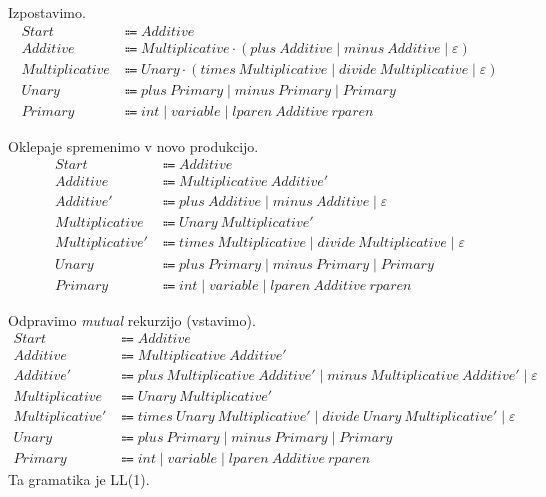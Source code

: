 \documentclass{report}
\newcommand{\Null}{\varepsilon}
\newcommand{\Seq}{\cdot}
\newcommand{\Spc}{\ }
\newcommand{\Union}{\mathrel{|}}
\newcommand{\Arrow}{\Coloneq}
\newcommand{\NT}[1]{{#1}}
\newcommand{\T}[1]{{#1}}
\begin{document}
Izpostavimo.
\begin{align*}
  \NT{Start} &\Arrow \NT{Additive}\\
  \NT{Additive} &\Arrow \NT{Multiplicative} \Seq (\T{plus} \Spc \NT{Additive} \Union \T{minus} \Spc \NT{Additive} \Union \Null)\\
  \NT{Multiplicative} &\Arrow \NT{Unary} \Seq (\T{times} \Spc \NT{Multiplicative} \Union \T{divide} \Spc \NT{Multiplicative} \Union \Null)\\
  \NT{Unary} &\Arrow \T{plus} \Spc \NT{Primary} \Union \T{minus} \Spc \NT{Primary} \Union \NT{Primary}\\ 
  \NT{Primary} &\Arrow \T{int} \Union \T{variable} \Union \T{lparen} \Spc \NT{Additive} \Spc \T{rparen}
\end{align*}

Oklepaje spremenimo v novo produkcijo.
\begin{align*}
  \NT{Start} &\Arrow \NT{Additive}\\
  \NT{Additive} &\Arrow \NT{Multiplicative} \Spc \NT{Additive'}\\
  \NT{Additive'} &\Arrow \T{plus} \Spc \NT{Additive} \Union \T{minus} \Spc \NT{Additive} \Union \Null\\
  \NT{Multiplicative} &\Arrow \NT{Unary} \Spc \NT{Multiplicative'}\\
  \NT{Multiplicative'} &\Arrow \T{times} \Spc \NT{Multiplicative} \Union \T{divide} \Spc \NT{Multiplicative} \Union \Null\\
  \NT{Unary} &\Arrow \T{plus} \Spc \NT{Primary} \Union \T{minus} \Spc \NT{Primary} \Union \NT{Primary}\\ 
  \NT{Primary} &\Arrow \T{int} \Union \T{variable} \Union \T{lparen} \Spc \NT{Additive} \Spc \T{rparen}
\end{align*}

Odpravimo \emph{mutual} rekurzijo (vstavimo).
\begin{align*}
  \NT{Start} &\Arrow \NT{Additive}\\[1em]
  \NT{Additive} &\Arrow \NT{Multiplicative} \Spc \NT{Additive'}\\
  \NT{Additive'} &\Arrow \T{plus} \Spc \NT{Multiplicative} \Spc \NT{Additive'} \Union \T{minus} \Spc \NT{Multiplicative} \Spc \NT{Additive'} \Union \Null\\[1em]
  \NT{Multiplicative} &\Arrow \NT{Unary} \Spc \NT{Multiplicative'}\\
  \NT{Multiplicative'} &\Arrow \T{times} \Spc \NT{Unary} \Spc \NT{Multiplicative'} \Union \T{divide} \Spc \NT{Unary} \Spc \NT{Multiplicative'} \Union \Null\\[1em]
  \NT{Unary} &\Arrow \T{plus} \Spc \NT{Primary} \Union \T{minus} \Spc \NT{Primary} \Union \NT{Primary}\\[1em]
  \NT{Primary} &\Arrow \T{int} \Union \T{variable} \Union \T{lparen} \Spc \NT{Additive} \Spc \T{rparen}
\end{align*}
Ta gramatika je LL(1).
\end{document}
